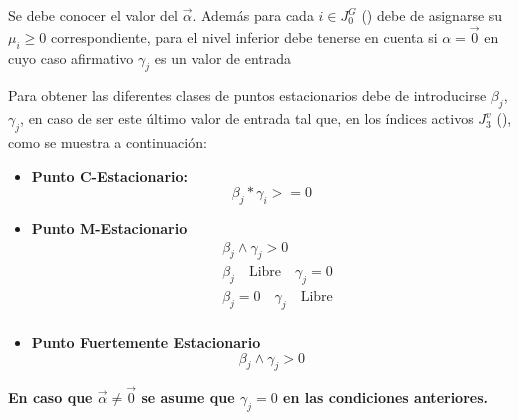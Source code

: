 Se debe conocer el valor del $\vec{\alpha}$. 
Además para cada $i \in J_0^G$ () debe de asignarse su $\mu_i \geq 0$ correspondiente,
para el nivel inferior debe tenerse en cuenta si $\alpha=\vec{0}$ en cuyo caso afirmativo $\gamma_j$ es un valor de entrada

\begin{samepage}
Para obtener las diferentes clases de puntos estacionarios debe de introducirse $\beta_j$, $\gamma_j$, en caso de ser este último valor de entrada tal que, en los índices activos $J_3^v$ (), como se muestra a continuación: 
\begin{itemize}
    \item \textbf{Punto C-Estacionario:}\\
    \begin{equation}
        \beta_j * \gamma_i >=0
        \label{Requisitos puntos C-Estacionario}
    \end{equation}
    \item \textbf{Punto M-Estacionario}\\
    \begin{equation}
        \begin{aligned}
            &\beta_j \land \gamma_j>0\\
            &\beta_j \quad \text{Libre} \quad \gamma_j=0\\
            &\beta_j=0 \quad \gamma_j \quad \text{Libre}\\
        \end{aligned}
        \label{Requisitos puntos M-Estacionarios}
    \end{equation}
    \item \textbf{Punto Fuertemente Estacionario}\\
     \begin{equation}
        \beta_j \land \gamma_j >0
    \label{Requisitos puntos Fuertemente Estacionarios}
    \end{equation}    
\end{itemize}
\textbf{En caso que $\vec{\alpha} \neq \vec{0}$ se asume que $\gamma_j=0$ en las condiciones anteriores.}
\end{samepage}

